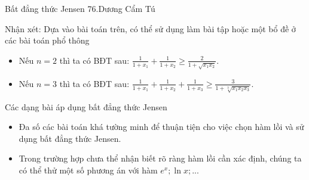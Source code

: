 \begin{frame}{{Bất đẳng thức Jensen} \hspace{6.5cm} 76.Dương Cẩm Tú} 
\begin{block}{Nhận xét: Dựa vào bài toán trên, có thể sử dụng làm bài tập hoặc một bổ đề ở các bài toán phổ thông}
\begin{itemize}
    \item Nếu $n=2$ thì ta có BĐT sau: $\frac{1}{1+x_1}+\frac{1}{1+x_2}\geq \frac{2}{1+\sqrt{x_1x_2}}$.\\
    \item Nếu $n=3$ thì ta có BĐT sau: $\frac{1}{1+x_1}+\frac{1}{1+x_2}+\frac{1}{1+x_3}\geq \frac{3}{1+\sqrt[3]{x_1x_2x_3}}$.
\end{itemize}
\end{block}
\begin{block}{Các dạng bài áp dụng bất đẳng thức Jensen}
\begin{itemize}
    \item Đa số các bài toán khá tường minh để thuận tiện cho việc chọn hàm lồi và sử dụng bất đẳng thức Jensen.
    \item Trong trường hợp chưa thể nhận biết rõ ràng hàm lồi cần xác định, chúng ta có thể thử một số phương án với hàm $e^x; \ln x;...$
\end{itemize}

\end{block}
\end{frame}
